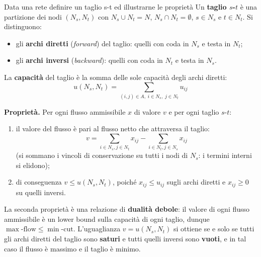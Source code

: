 \documentclass[12pt]{extarticle} %
\begin{document}
\begin{teoriabox}{Data una rete definire un taglio s-t ed illustrarne le proprietà}
Un \textbf{taglio $s$-$t$} è una partizione dei nodi $(N_s, N_t)$ con $N_s \cup N_t = N$, $N_s \cap N_t = \emptyset$, $s \in N_s$ e $t \in N_t$. Si distinguono:
\begin{itemize}
    \item gli \textbf{archi diretti} (\textit{forward}) del taglio: quelli con coda in $N_s$ e testa in $N_t$;
    \item gli \textbf{archi inversi} (\textit{backward}): quelli con coda in $N_t$ e testa in $N_s$.
\end{itemize}
La \textbf{capacità} del taglio è la somma delle sole capacità degli archi diretti:
\[
u(N_s,N_t) = \sum_{(i,j) \in A,\; i \in N_s,\; j \in N_t} u_{ij}
\]

\noindent\textbf{Proprietà.} Per ogni flusso ammissibile $x$ di valore $v$ e per ogni taglio $s$-$t$:
\begin{enumerate}
    \item il valore del flusso è pari al flusso netto che attraversa il taglio:
    \[
    v = \sum_{i \in N_s, j\in N_t} x_{ij} - \sum_{i\in N_t, j \in N_s} x_{ij}
    \]
    (si sommano i vincoli di conservazione su tutti i nodi di $N_s$: i termini interni si elidono);
    \item di conseguenza $v \le u(N_s,N_t)$, poiché $x_{ij} \le u_{ij}$ sugli archi diretti e $x_{ij} \ge 0$ su quelli inversi.
\end{enumerate}
La seconda proprietà è una relazione di \textbf{dualità debole}: il valore di ogni flusso ammissibile è un lower bound sulla capacità di ogni taglio, dunque $\max\text{-flow} \le \min\text{-cut}$. L'uguaglianza $v = u(N_s,N_t)$ si ottiene se e solo se tutti gli archi diretti del taglio sono \textbf{saturi} e tutti quelli inversi sono \textbf{vuoti}, e in tal caso il flusso è massimo e il taglio è minimo.
\end{teoriabox}
\end{document}
